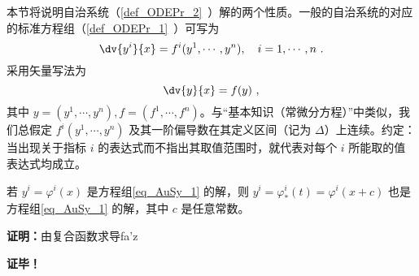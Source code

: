
本节将说明自治系统（\autoref{def_ODEPr_2}~）解的两个性质。一般的自治系统的对应的标准方程组（\autoref{def_ODEPr_1}~）可写为
\begin{equation}\label{eq_AuSy_1}
\dv{y^i}{x}=f^i(y^1,\cdots,y^n),\quad i=1,\cdots,n~.
\end{equation}
采用矢量写法为
\begin{equation}
\dv{y}{x}=f(y)~,
\end{equation}
其中 $y=(y^1,\cdots,y^n),f=(f^1,\cdots,f^n)$。与“基本知识（常微分方程）”中类似，我们总假定 $f^i(y^1,\cdots,y^n)$ 及其一阶偏导数在其定义区间（记为 $\Delta$）上连续。约定：当出现关于指标 $i$ 的表达式而不指出其取值范围时，就代表对每个 $i$ 所能取的值表达式均成立。

\begin{theorem}{}
若 $y^i=\varphi^i(x)$ 是方程组\autoref{eq_AuSy_1} 的解，则 $y^i=\varphi_*^i(t)=\varphi^i(x+c)$ 也是方程组\autoref{eq_AuSy_1} 的解，其中 $c$ 是任意常数。
\end{theorem}
\textbf{证明：}由复合函数求导fa'z


\textbf{证毕！}